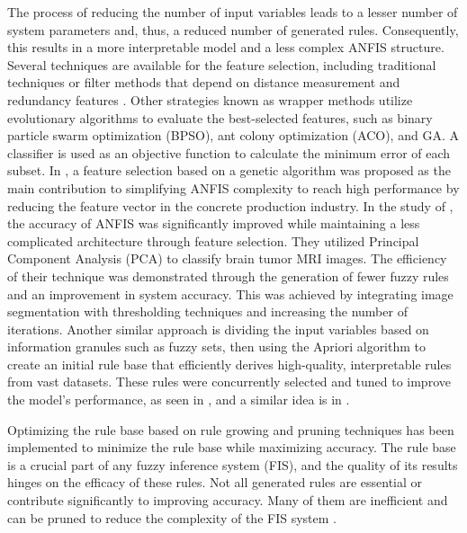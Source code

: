 The process of reducing the number of input variables leads to a lesser number of system parameters and, thus, a reduced number of generated rules. Consequently, this results in a more interpretable model and a less complex ANFIS structure. Several techniques are available for the feature selection, including traditional techniques or filter methods that depend on distance measurement and redundancy features \cite{li2022feature}\cite{saberi2022dual}. Other strategies known as wrapper methods utilize evolutionary algorithms to evaluate the best-selected features, such as binary particle swarm optimization (BPSO), ant colony optimization (ACO), and GA. A classifier is used as an objective function to calculate the minimum error of each subset.
In \cite{rahchamani2021hybrid}, a feature selection based on a genetic algorithm was proposed as the main contribution to simplifying ANFIS complexity to reach high performance by reducing the feature vector in the concrete production industry.
In the study of \cite{birgani2019optimization}, the accuracy of ANFIS was significantly improved while maintaining a less complicated architecture through feature selection. They utilized Principal Component Analysis (PCA) to classify brain tumor MRI images. The efficiency of their technique was demonstrated through the generation of fewer fuzzy rules and an improvement in system accuracy. This was achieved by integrating image segmentation with thresholding techniques and increasing the number of iterations.
Another similar approach is dividing the input variables based on information granules such as fuzzy sets, then using the Apriori algorithm to create an initial rule base that efficiently derives high-quality, interpretable rules from vast datasets. These rules were concurrently selected and tuned to improve the model's performance, as seen in \cite{fazzolari2014multi}, and a similar idea is in \cite{antonelli2016multi}.

Optimizing the rule base based on rule growing and pruning techniques has been implemented to minimize the rule base while maximizing accuracy. The rule base is a crucial part of any fuzzy inference system (FIS), and the quality of its results hinges on the efficacy of these rules. Not all generated rules are essential or contribute significantly to improving accuracy. Many of them are inefficient and can be pruned to reduce the complexity of the FIS system \cite{rini2013balanced}\cite{hussain2015analysis}.

